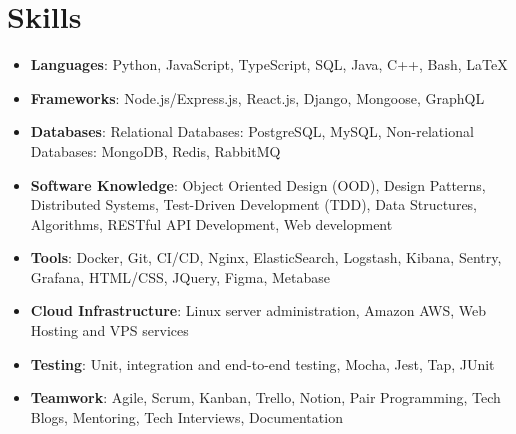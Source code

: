\documentclass[letterpaper,10.8pt]{article}
\newcommand{\resumeItemWithTitle}[2]{
  \item\small{
    \textbf{#1}{: #2 \vspace{-4pt}}
  }
}
\newcommand{\resumeSubItem}[2]{\resumeItemWithTitle{#1}{#2}\vspace{-4pt}}
\newcommand{\resumeSubHeadingListStart}{\begin{itemize}[leftmargin=*]}
\newcommand{\resumeSubHeadingListEnd}{\end{itemize}}
\begin{document}

%
\section{Skills}
\resumeSubHeadingListStart
	\resumeItemWithTitle{Languages}{Python, JavaScript, TypeScript, SQL, Java, C++, Bash, LaTeX} 
    \resumeItemWithTitle{Frameworks}{Node.js/Express.js, React.js, Django, Mongoose, GraphQL} 
    \resumeItemWithTitle{Databases}{Relational Databases: PostgreSQL, MySQL, Non-relational Databases: MongoDB, Redis, RabbitMQ}
    \resumeItemWithTitle{Software Knowledge}{Object Oriented Design (OOD), Design Patterns, Distributed Systems, Test-Driven Development (TDD), Data Structures, Algorithms, RESTful API Development, Web development}
    \resumeItemWithTitle{Tools}{Docker, Git, CI/CD, Nginx, ElasticSearch, Logstash, Kibana, Sentry, Grafana, HTML/CSS, JQuery, Figma, Metabase}
    \resumeItemWithTitle{Cloud Infrastructure}{Linux server administration, Amazon AWS, Web Hosting and VPS services}
    \resumeItemWithTitle{Testing}{Unit, integration and end-to-end testing, Mocha, Jest, Tap, JUnit}
    \resumeItemWithTitle{Teamwork}{Agile, Scrum, Kanban, Trello, Notion, Pair Programming, Tech Blogs, Mentoring, Tech Interviews, Documentation}
\resumeSubHeadingListEnd
\end{document}
